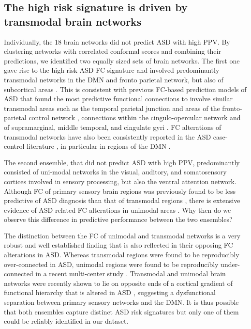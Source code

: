 \documentclass[9pt,lineno]{elife}
\begin{document}
\subsection{The high risk signature is driven by transmodal brain networks}
Individually, the 18 brain networks did not predict ASD with high PPV. By clustering networks with correlated conformal scores and combining their predictions, we identified two equally sized sets of brain networks. The first one gave rise to the high risk ASD FC-signature and involved predominantly transmodal networks in the DMN and fronto parietal network, but also of subcortical areas \citep{Alves2019-ks}. This is consistent with previous FC-based prediction models of ASD that found the most predictive functional connections to involve similar transmodal areas such as the temporal parietal junction and areas of the fronto-parietal control network \citep{Abraham2017-vf}, connections within the cingulo-opercular network \citep{Yahata2016-jk} and of supramarginal, middle temporal, and cingulate gyri \citep{Heinsfeld2018-yl}. FC alterations of transmodal networks have also been consistently reported in the ASD case-control literature \citep{Monk2009-go,Holiga2019-ub,Just2007-ho}, in particular in regions of the DMN \citep{Washington2014-nx,Assaf2010-jx}.

The second ensemble, that did not predict ASD with high PPV, predominantly consisted of uni-modal networks in the visual, auditory, and somatosensory cortices involved in sensory processing, but also the ventral attention network. Although FC of primary sensory brain regions was previously found to be less predictive of ASD diagnosis than that of transmodal regions \citep{Heinsfeld2018-yl}, there is extensive evidence of ASD related FC alterations in unimodal areas \citep{Oldehinkel2019-ra}. Why then do we observe this difference in predictive performance between the two ensembles?

The distinction between the FC of unimodal and transmodal networks is a very robust and well established finding \citep{Raichle2001-et,Fox2005-ay,Buckner2019-vs} that is also reflected in their opposing FC alterations in ASD. Whereas transmodal regions were found to be reproducibly over-connected in ASD, unimodal regions were found to be reproducibly under-connected in a recent multi-center study \citep{Holiga2019-ub}. Transmodal and unimodal brain networks were recently shown to lie on opposite ends of a cortical gradient of functional hierarchy \citep{Margulies2016-rd} that is altered in ASD \citep{Hong2019-hp}, suggesting a dysfunctional separation between primary sensory networks and the DMN. It is thus possible that both ensembles capture distinct ASD risk signatures but only one of them could be reliably identified in our dataset. 
\end{document}
